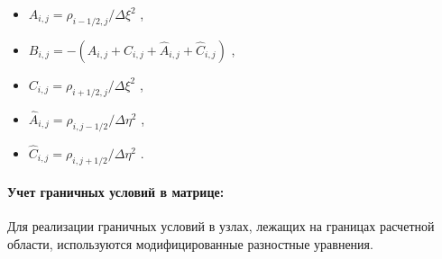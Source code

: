 	\begin{itemize}
		\item $A_{i,j} = \rho_{i-1/2,j} / \Delta \xi^2$ ,
		\item $B_{i,j} = -(A_{i,j} + C_{i,j} + \hat{A}_{i,j} + \hat{C}_{i,j})$ ,
		\item $C_{i,j} = \rho_{i+1/2,j} / \Delta \xi^2$ ,
		\item $\hat{A}_{i,j} = \rho_{i,j-1/2} / \Delta \eta^2$ ,
		\item $\hat{C}_{i,j} = \rho_{i,j+1/2} / \Delta \eta^2$ .
	\end{itemize}
	
	\paragraph{Учет граничных условий в матрице:}
	Для реализации граничных условий в узлах, лежащих на границах расчетной области, используются модифицированные разностные уравнения. 
	

